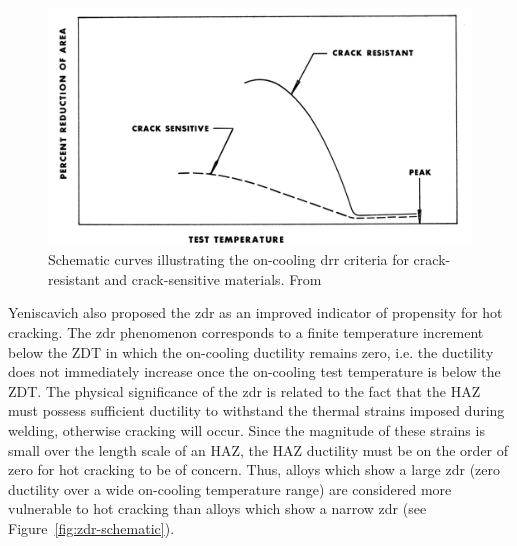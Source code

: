 \begin{figure}
\centering
\includegraphics[width=6in]{figures/yeniscavich-drr.png}
\caption{Schematic curves illustrating the on-cooling \acrshort{drr} criteria for crack-resistant and crack-sensitive materials.  From \citet[Fig.~2]{yeniscavich_correlation_1970}}
\label{fig:drr-schematic}
\end{figure}

Yeniscavich also proposed the \gls{zdr} as an improved indicator of propensity for hot cracking. The \gls{zdr} phenomenon corresponds to a finite temperature increment below the ZDT in which the on-cooling ductility remains zero, i.e. the ductility does not immediately increase once the on-cooling test temperature is below the ZDT. The physical significance of the \gls{zdr} is related to the fact that the HAZ must possess sufficient ductility to withstand the thermal strains imposed during welding, otherwise cracking will occur. Since the magnitude of these strains is small over the length scale of an HAZ, the HAZ ductility must be on the order of zero for hot cracking to be of concern. Thus, alloys which show a large \gls{zdr} (zero ductility over a wide on-cooling temperature range) are considered more vulnerable to hot cracking than alloys which show a narrow \gls{zdr} (see Figure~\ref{fig:zdr-schematic}).

